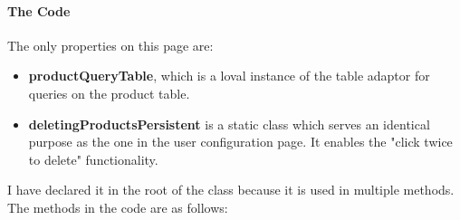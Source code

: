 ﻿\documentclass{article}
\begin{document}
    \paragraph{The Code}
    The only properties on this page are:
    \begin{itemize}
        \item \textbf{productQueryTable}, which is a loval instance of the table adaptor for queries on the product table.
        \item \textbf{deletingProductsPersistent} is a static class which serves an identical purpose as the one in the user configuration page.
        It enables the "click twice to delete" functionality.
    \end{itemize}
    I have declared it in the root of the class because it is used in multiple methods.
    The methods in the code are as follows:
\end{document}
